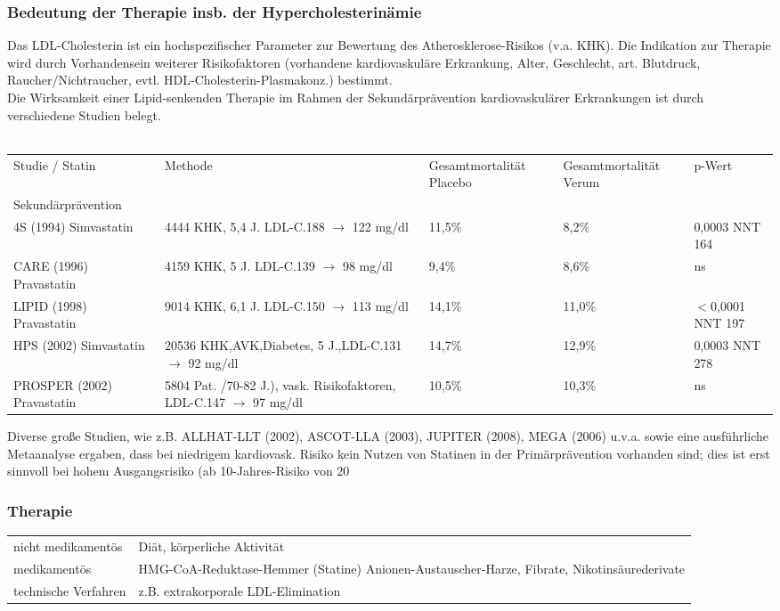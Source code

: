 \documentclass[10pt,a4paper]{report}
\begin{document}
\subsubsection{Bedeutung der Therapie insb. der Hypercholesterinämie} %
\label{ssub:bedeutung_der_therapie_insb_der_hypercholesterin_mie}
Das LDL-Cholesterin ist ein hochspezifischer Parameter zur Bewertung des Atherosklerose-Risikos (v.a. KHK). Die Indikation zur Therapie wird durch Vorhandensein weiterer Risikofaktoren (vorhandene kardiovaskuläre Erkrankung, Alter, Geschlecht, art. Blutdruck, Raucher/Nichtraucher, evtl. HDL-Cholesterin-Plasmakonz.) bestimmt. \\
Die Wirksamkeit einer Lipid-senkenden Therapie im Rahmen der Sekundärprävention kardiovaskulärer Erkrankungen ist durch verschiedene Studien belegt. \\ \\
\begin{tabularx}{\textwidth}{XXXXX}
Studie / Statin&Methode&Gesamtmortalität Placebo&Gesamtmortalität Verum&p-Wert\\
Sekundärprävention&&&&\\
4S (1994) Simvastatin&4444 KHK, 5,4 J. LDL-C.188 $\rightarrow$ 122 mg/dl&11,5\%&8,2\%&0,0003 NNT 164\\
CARE (1996) Pravastatin&4159 KHK, 5 J. LDL-C.139 $\rightarrow$ 98 mg/dl&9,4\%&8,6\%&ns\\
LIPID (1998) Pravastatin&9014 KHK, 6,1 J. LDL-C.150 $\rightarrow$ 113 mg/dl&14,1\%&11,0\%&$<$0,0001 NNT 197\\
HPS (2002) Simvastatin&20536 KHK,AVK,Diabetes, 5 J.,LDL-C.131 $\rightarrow$ 92 mg/dl&14,7\%&12,9\%&0,0003 NNT 278\\
PROSPER (2002) Pravastatin&5804 Pat. /70-82 J.), vask. Risikofaktoren, LDL-C.147 $\rightarrow$ 97 mg/dl&10,5\%&10,3\%&ns\\
\end{tabularx}
Diverse große Studien, wie z.B. ALLHAT-LLT (2002), ASCOT-LLA (2003), JUPITER (2008), MEGA (2006) u.v.a. sowie eine ausführliche Metaanalyse ergaben, dass bei niedrigem kardiovask. Risiko kein Nutzen von Statinen in der Primärprävention vorhanden sind; dies ist erst sinnvoll bei hohem Ausgangsrisiko (ab 10-Jahres-Risiko von 20%
\subsubsection{Therapie} %
\label{ssub:therapie}
\begin{tabularx}{\textwidth}{XX}
nicht medikamentös&Diät, körperliche Aktivität\\
medikamentös&HMG-CoA-Reduktase-Hemmer (Statine)	Anionen-Austauscher-Harze, Fibrate, Nikotinsäurederivate\\
technische Verfahren&z.B. extrakorporale LDL-Elimination\\
\end{tabularx}
\end{document}
